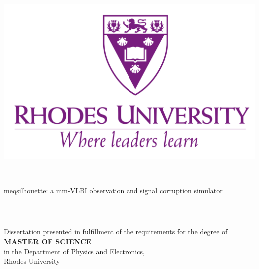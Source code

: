 \begin{titlepage}

\newcommand{\HRule}{\rule{\linewidth}{0.5mm}} %

\center %
 

\includegraphics[width=0.4\columnwidth]{Images/Rhode.png}\\[1cm] %



\HRule \\[0.4cm]
{ \huge {\sc meqsilhouette}: a mm-VLBI observation and signal corruption simulator}\\[0.4cm]
\HRule \\[1.5cm]


\begin{center}
 {\large Dissertation presented in fulfillment of the requirements for the degree of} \\
 {\large \textbf{MASTER OF SCIENCE}} \\
 {\large in the Department of Physics and Electronics,} \\
 {\large Rhodes University}
\end{center}
\vspace{0.02\textheight}



\end{titlepage}
